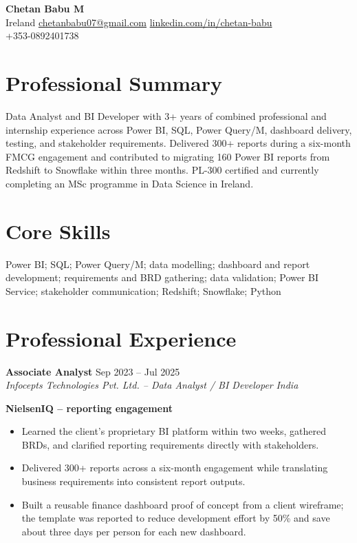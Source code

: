 \documentclass[a4paper,10pt]{article}
\newcommand{\roleheading}[4]{%
  \textbf{#1} \hfill #2\\
  \textit{#3} \hfill \textit{#4}\vspace{3pt}
}
\newcommand{\clientheading}[1]{\textbf{#1}\vspace{1pt}}
\newenvironment{resumeitems}{\begin{itemize}}{\end{itemize}}
\newcommand{\ResumeSummary}{Data Analyst and BI Developer with 3+ years of combined professional and internship experience across Power BI, SQL, Power Query/M, dashboard delivery, testing, and stakeholder requirements. Delivered 300+ reports during a six-month FMCG engagement and contributed to migrating 160 Power BI reports from Redshift to Snowflake within three months. PL-300 certified and currently completing an MSc programme in Data Science in Ireland.}
\newcommand{\CoreSkills}{Power BI; SQL; Power Query/M; data modelling; dashboard and report development; requirements and BRD gathering; data validation; Power BI Service; stakeholder communication; Redshift; Snowflake; Python}
\begin{document}
\begin{center}
  {\LARGE\bfseries Chetan Babu M}\\[3pt]
  Ireland \textbar{} \href{mailto:chetanbabu07@gmail.com}{chetanbabu07@gmail.com} \textbar{} \href{https://linkedin.com/in/chetan-babu}{linkedin.com/in/chetan-babu}\\[2pt]
  +353-0892401738
\end{center}

\section{Professional Summary}
\ResumeSummary

\section{Core Skills}
\CoreSkills

\section{Professional Experience}

\roleheading{Associate Analyst}{Sep 2023 -- Jul 2025}{Infocepts Technologies Pvt. Ltd. -- Data Analyst / BI Developer}{India}

\clientheading{NielsenIQ -- reporting engagement}
\begin{resumeitems}
  \item Learned the client's proprietary BI platform within two weeks, gathered BRDs, and clarified reporting requirements directly with stakeholders.
  \item Delivered 300+ reports across a six-month engagement while translating business requirements into consistent report outputs.
  \item Built a reusable finance dashboard proof of concept from a client wireframe; the template was reported to reduce development effort by 50\% and save about three days per person for each new dashboard.
\end{resumeitems}
\end{document}
